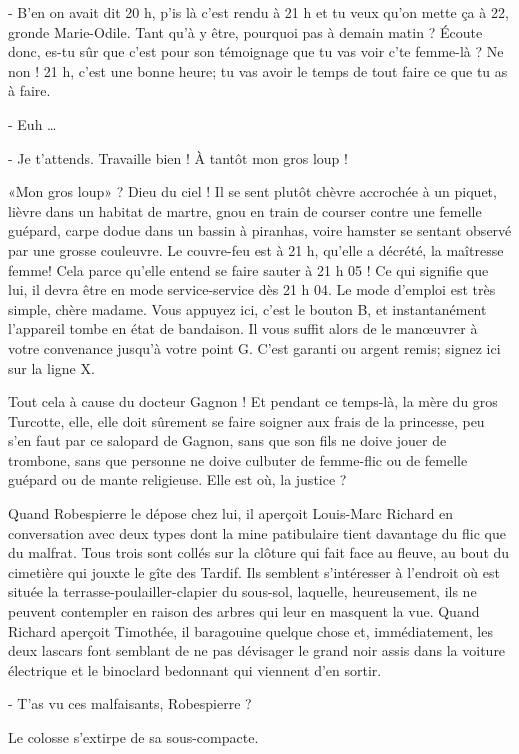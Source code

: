 - B’en on avait dit 20 h, p’is là c’est rendu à 21 h et tu veux qu’on mette ça à 22, gronde Marie-Odile. Tant qu’à y être, pourquoi pas à demain matin ? Écoute donc, es-tu sûr que c’est pour son témoignage que tu vas voir c’te femme-là ? Ne non ! 21 h, c’est une bonne heure; tu vas avoir le temps de tout faire ce que tu as à faire.

- Euh …

- Je t’attends. Travaille bien ! À tantôt mon gros loup !

«Mon gros loup» ? Dieu du ciel ! Il se sent plutôt chèvre accrochée à un piquet, lièvre dans un habitat de martre, gnou en train de courser contre une femelle guépard, carpe dodue dans un bassin à piranhas, voire hamster se sentant observé par une grosse couleuvre. Le couvre-feu est à 21 h, qu’elle a décrété, la maîtresse femme! Cela parce qu’elle entend se faire sauter à 21 h 05 ! Ce qui signifie que lui, il devra être en mode service-service dès 21 h 04. Le mode d’emploi est très simple, chère madame. Vous appuyez ici, c’est le bouton B, et instantanément l’appareil tombe en état de bandaison. Il vous suffit alors de le manœuvrer à votre convenance jusqu’à votre point G. C’est garanti ou argent remis; signez ici sur la ligne X.

Tout cela à cause du docteur Gagnon ! Et pendant ce temps-là, la mère du gros Turcotte, elle, elle doit sûrement se faire soigner aux frais de la princesse, peu s’en faut par ce salopard de Gagnon, sans que son fils ne doive jouer de trombone, sans que personne ne doive culbuter de femme-flic ou de femelle guépard ou de mante religieuse. Elle est où, la justice ?

Quand Robespierre le dépose chez lui, il aperçoit Louis-Marc Richard en conversation avec deux types dont la mine patibulaire tient davantage du flic que du malfrat. Tous trois sont collés sur la clôture qui fait face au fleuve, au bout du cimetière qui jouxte le gîte des Tardif. Ils semblent s’intéresser à l’endroit où est située la terrasse-poulailler-clapier du sous-sol, laquelle, heureusement, ils ne peuvent contempler en raison des arbres qui leur en masquent la vue. Quand Richard aperçoit Timothée, il baragouine quelque chose et, immédiatement, les deux lascars font semblant de ne pas dévisager le grand noir assis dans la voiture électrique et le binoclard bedonnant qui viennent d’en sortir.

- T’as vu ces malfaisants, Robespierre ?

Le colosse s’extirpe de sa sous-compacte.

